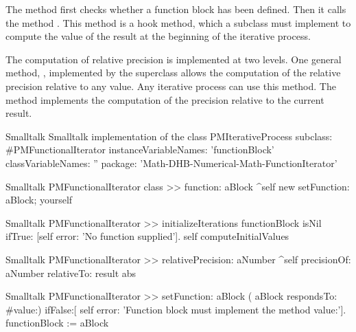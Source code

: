 The method  first checks whether a
function block has been defined. Then it calls the method . This method is a hook method, which a
subclass must implement to compute the value of the result at the
beginning of the iterative process.

The computation of relative precision is implemented at two
levels. One general method, ,
implemented by the superclass allows the computation of the
relative precision relative to any value. Any iterative process
can use this method. The method  implements
the computation of the precision relative to the current result.

\begin{listing}[label=lst:iterrel]{Smalltalk}
{Smalltalk implementation of the class }
PMIterativeProcess subclass: #PMFunctionalIterator
   instanceVariableNames: 'functionBlock'
   classVariableNames: ''
   package: 'Math-DHB-Numerical-Math-FunctionIterator'
\end{listing}

\begin{displaycode}{Smalltalk}
PMFunctionalIterator class >> function: aBlock
    ^self new setFunction: aBlock; yourself
\end{displaycode}

\begin{displaycode}{Smalltalk}
PMFunctionalIterator >> initializeIterations
    functionBlock isNil ifTrue: [self error: 'No function supplied'].
    self computeInitialValues
\end{displaycode}

\begin{displaycode}{Smalltalk}
PMFunctionalIterator >> relativePrecision: aNumber
    ^self precisionOf: aNumber relativeTo: result abs
\end{displaycode}

\begin{displaycode}{Smalltalk}
PMFunctionalIterator >> setFunction: aBlock
    ( aBlock respondsTo: #value:)
        ifFalse:[ self error: 'Function block must implement the 
                                                      method value:'].
    functionBlock := aBlock
\end{displaycode}

